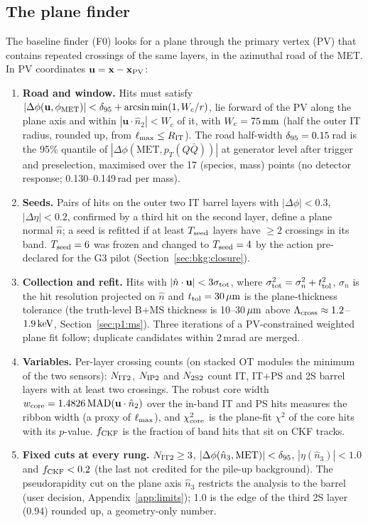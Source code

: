 \subsection{The plane finder}\label{sec:strategy:finder}
The baseline finder (F0) looks for a plane through the primary vertex (PV) that contains repeated crossings of the same
layers, in the azimuthal road of the MET. In PV coordinates $\mathbf u=\mathbf x-\mathbf x_{\rm PV}$:
\begin{enumerate}
\item \textbf{Road and window.} Hits must satisfy $|\Delta\phi(\mathbf u,\phi_{\rm MET})|<\delta_{95}+\arcsin\min(1,W_c/r)$,
  lie forward of the PV along the plane axis and within $|\mathbf u\cdot\hat n_2|<W_c$ of it, with $W_c=75\,\mathrm{mm}$ (half the
  outer IT radius, rounded up, from $\ell_{\max}\le R_{\rm IT}$). The road half-width $\delta_{95}=0.15$\,rad is the 95\% quantile
  of $|\Delta\phi(\mathrm{MET},p_T(Q\bar Q))|$ at generator level after trigger and preselection, maximised over the 17
  (species, mass) points (no detector response; 0.130--0.149\,rad per mass).
\item \textbf{Seeds.} Pairs of hits on the outer two IT barrel layers with $|\Delta\phi|<0.3$, $|\Delta\eta|<0.2$, confirmed
  by a third hit on the second layer, define a plane normal $\hat n$; a seed is refitted if at least $T_{\rm seed}$ layers have
  $\ge2$ crossings in its band. $T_{\rm seed}=6$ was frozen and changed to $T_{\rm seed}=4$ by the action pre-declared for the G3 pilot
  (Section~\ref{sec:bkg:closure}).
\item \textbf{Collection and refit.} Hits with $|\hat n\cdot\mathbf u|<3\sigma_{\rm tot}$, where
  $\sigma_{\rm tot}^2=\sigma_n^2+t_{\rm tol}^2$, $\sigma_n$ is the hit resolution projected on $\hat n$ and
  $t_{\rm tol}=30\,\mu\mathrm{m}$ is the plane-thickness tolerance (the truth-level B+MS thickness is 10--30$\,\mu\mathrm{m}$ above
  $\Lambda_{\rm cross}\approx1.2$--$1.9\,\mathrm{keV}$, Section~\ref{sec:p1:ms}). Three iterations of a PV-constrained weighted plane fit follow; duplicate
  candidates within 2\,mrad are merged.
\item \textbf{Variables.} Per-layer crossing counts (on stacked OT modules the minimum of the two sensors): $N_{\rm IT2}$, $N_{\rm
  IP2}$ and $N_{\rm 2S2}$ count IT, IT+PS and 2S barrel layers with at least two crossings. The robust core width
  $w_{\rm core}=1.4826\,\mathrm{MAD}(\mathbf u\cdot\hat n_2)$ over the in-band IT and PS hits measures the ribbon width (a proxy of
  $\ell_{\max}$), and $\chi^2_{\rm core}$ is the plane-fit $\chi^2$ of the core hits with its $p$-value. $f_{\rm CKF}$ is the fraction of
  band hits that sit on CKF tracks.
\item \textbf{Fixed cuts at every rung.} $N_{\rm IT2}\ge3$, $|\Delta\phi(\hat n_3,\mathrm{MET})|<\delta_{95}$,
  $|\eta(\hat n_3)|<1.0$ and $f_{\rm CKF}<0.2$ (the last not credited for the pile-up background). The pseudorapidity cut on
  the plane axis $\hat n_3$ restricts the analysis to the barrel (user decision, Appendix~\ref{app:limits}); 1.0 is the edge of the third 2S
  layer (0.94) rounded up, a geometry-only number.
\end{enumerate}
